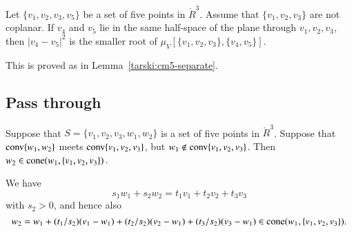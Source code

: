 \begin{tarskidata}
\begin{tarski}

\begin{lemma} 
Let $\{v_1,v_2,v_3,v_5\}$ be a set of five
points in $\ring{R}^3$.  Assume that $\{v_1,v_2,v_3\}$ are not
coplanar.
If $v_4$ and $v_5$ lie in the same half-space of the plane through $v_1,v_2,v_3$, then 
 $|v_4-v_5|^2$ is the smaller root of $\mu_V[\{v_1,v_2,v_3\},\{v_4,v_5\}]$.
\end{lemma}

\begin{proved} This is proved as in Lemma~\ref{tarski:cm5-separate}.
\swallowed\end{proved}
\end{tarski}










\begin{tarski}
\section{Pass through}

\begin{lemma}
Suppose that $S=\{v_1,v_2,v_3,w_1,w_2\}$
is a set of five points in  $\ring{R}^3$.  Suppose
that  ${\operatorname{conv}}\{w_1,w_2\}$ meets ${\operatorname{conv}}\{v_1,v_2,v_3\}$,
but $w_1\not\in{\operatorname{conv}}\{v_1,v_2,v_3\}$.
Then $w_2\in{\operatorname{cone}}(w_1,\{v_1,v_2,v_3\})$.
\end{lemma}

\begin{proved}
We have 
  $$
  s_1 w_1 + s_2 w_2 = t_1 v_1 + t_2 v_2 + t_3 v_3
  $$
with $s_2>0$,
and hence also
  $$
  w_2 = w_1 + (t_1/s_2) (v_1-w_1) + 
       (t_2/s_2) (v_2 - w_1) + (t_3/s_2) (v_3-w_1)\in 
   {\operatorname{cone}}(w_1,\{v_1,v_2,v_3\}).
  $$
\swallowed\end{proved}
\end{tarski}






\end{tarskidata}
